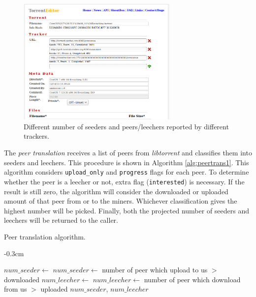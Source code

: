 \begin{figure}[ht]
	\centering
	\includegraphics[width=0.7\textwidth]{pics/diffsr.png}
	\caption{Different number of seeders and peers/leechers reported by different trackers.}
	\label{fig:diffsr}
\end{figure}

The \textit{peer translation} receives a list of peers from \textit{libtorrent} and classifies them into seeders and leechers. This procedure is shown in Algorithm \ref{alg:peertrans1}. This algorithm considers \texttt{upload\_only} and \texttt{progress} flags for each peer. To determine whether the peer is a leecher or not, extra flag (\texttt{interested}) is necessary. If the result is still zero, the algorithm will consider the downloaded or uploaded amount of that peer from or to the miners. Whichever classification gives the highest number will be picked. Finally, both the projected number of seeders and leechers will be returned to the caller.

\begin{algorithm}[t]
	\caption{Peer translation algorithm.}
	\label{alg:peertrans1}
	\begin{adjustwidth}{}{-0.3cm}
	\begin{algorithmic}[1]
		\Statex
		\State $num\_seeder \gets $ 
		\State $num\_seeder \gets $ number of peer which upload to us $>$ downloaded
		\EndIf
		\State $num\_leecher \gets $  \label{alg:peertrans1:pickleech}
		\State $num\_leecher \gets $ number of peer which download from us $>$ uploaded
		\EndIf
		\State \Return $num\_seeder$, $num\_leecher$
		\EndFunction
	\end{algorithmic}
	\end{adjustwidth}
\end{algorithm}


